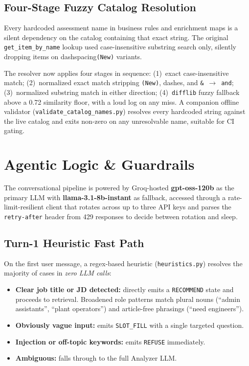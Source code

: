 \documentclass[10pt,twocolumn,letterpaper]{article}
\begin{document}
\subsection{Four-Stage Fuzzy Catalog Resolution}

Every hardcoded assessment name in business rules and enrichment maps
is a silent dependency on the catalog containing that exact string.
The original \texttt{get\_item\_by\_name} lookup used case-insensitive
substring search only, silently dropping items on dash\/spacing\/\texttt{(New)} variants.

The resolver now applies four stages in sequence: (1)~exact
case-insensitive match; (2)~normalized exact match stripping
\texttt{(New)}, dashes, and \texttt{\&}~$\rightarrow$~\texttt{and};
(3)~normalized substring match in either direction;
(4)~\texttt{difflib} fuzzy fallback above a 0.72 similarity floor,
with a loud log on any miss. A companion offline validator
(\texttt{validate\_catalog\_names.py}) resolves every hardcoded string
against the live catalog and exits non-zero on any unresolvable name,
suitable for CI gating.


\section{Agentic Logic \& Guardrails}

The conversational pipeline is powered by Groq-hosted
\textbf{gpt-oss-120b} as the primary LLM with \textbf{llama-3.1-8b-instant}
as fallback, accessed through a rate-limit-resilient client that rotates
across up to three API keys and parses the \texttt{retry-after} header
from 429 responses to decide between rotation and sleep.

\subsection{Turn-1 Heuristic Fast Path}

On the first user message, a regex-based heuristic
(\texttt{heuristics.py}) resolves the majority of cases in
\textit{zero LLM calls}:

\begin{itemize}

\item \textbf{Clear job title or JD detected:}
directly emits a \texttt{RECOMMEND} state and proceeds to retrieval.
Broadened role patterns match plural nouns (``admin assistants'',
``plant operators'') and article-free phrasings (``need engineers'').

\item \textbf{Obviously vague input:}
emits \texttt{SLOT\_FILL} with a single targeted question.

\item \textbf{Injection or off-topic keywords:}
emits \texttt{REFUSE} immediately.

\item \textbf{Ambiguous:} falls through to the full Analyzer LLM.

\end{itemize}
\end{document}
